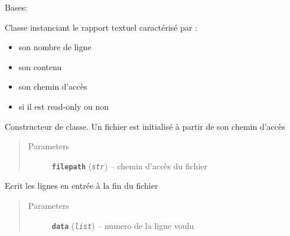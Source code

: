 \documentclass[letterpaper,10pt,english]{sphinxmanual}
\begin{document}
\begin{fulllineitems}
\label{loganalyser:loganalyser.fichier.FichierRapportTextuel}
Bases: {\hyperref[loganalyser:loganalyser.fichier.Fichier]{\emph{}}}

Classe instanciant le rapport textuel caractérisé par :
\begin{itemize}
\item {} 
son nombre de ligne

\item {} 
son contenu

\item {} 
son chemin d'accès

\item {} 
si il est read-only ou non

\end{itemize}

\begin{fulllineitems}
\label{loganalyser:loganalyser.fichier.FichierRapportTextuel.__init__}
Constructeur de classe. Un fichier est initialisé à partir de son chemin d'accès
\begin{quote}\begin{description}
\item[{Parameters}] \leavevmode
\textbf{\texttt{filepath}} (\emph{\texttt{str}}) -- chemin d'accès du fichier

\end{description}\end{quote}

\end{fulllineitems}


\begin{fulllineitems}
\label{loganalyser:loganalyser.fichier.FichierRapportTextuel.ecriretexte}
Ecrit les lignes en entrée à la fin du fichier
\begin{quote}\begin{description}
\item[{Parameters}] \leavevmode
\textbf{\texttt{data}} (\emph{\texttt{list}}) -- numero de la ligne voulu

\end{description}\end{quote}

\end{fulllineitems}


\end{fulllineitems}
\end{document}
